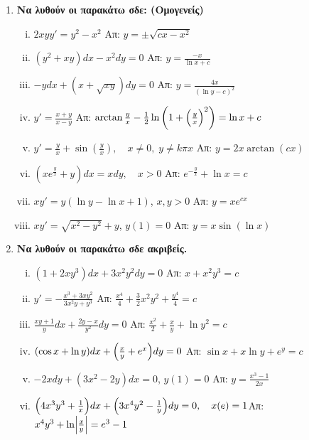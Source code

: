 \documentclass[a4paper,table]{report}
\begin{document}
\begin{enumerate}
  \item {\bfseries Να λυθούν οι παρακάτω σδε: (Ομογενείς)}
    \begin{enumerate}[i)]
      \item $ 2xy y' = y^{2} - x^{2} $ \hfill Απ: $ y = \pm \sqrt{cx-x^{2}} $ 
      \item $ \left(y^{2}+xy\right)dx - x^{2}dy =0 $ 
        \hfill Απ: $ y= \frac{-x}{\ln{x} + c} $ 
      \item $ -ydx+(x+ \sqrt{xy} )dy=0 $ \hfill Απ: $ y= \frac{4x}{(\ln{y} -c)^{2}} $  
      \item $ y'= \frac{x+y}{x-y} $ \hfill Απ: $ \arctan \frac{y}{x} - \frac{1}{2}
        \ln{\left(1 + \Bigl(\frac{y}{x}\Bigr)^{2}\right)} = \ln{x} + c  $  
      \item $y'=\frac{y}{x}+\sin(\frac{y}{x}), \quad x\neq 0,\; y\neq k\pi x$ 
        \hfill Απ: $y=2x\arctan(cx)$
      \item $\left(xe^{\frac{y}{x}}+y\right)dx=xdy, \quad x>0$ 
        \hfill Απ: $e^{-\frac{y}{x}}+\ln x =c$
      \item $ xy'=y(\ln{y} - \ln{x} +1) $, \quad $ x,y>0 $ \hfill Απ: $ y=xe^{cx} $ 
      \item $ xy' = \sqrt{ x^{2}-y^{2} } +y $, \quad $ y(1)=0 $ 
        \hfill Απ: $ y = x \sin{(\ln{x})}$  
    \end{enumerate}

  \item {\bfseries Να λυθούν οι παρακάτω σδε ακριβείς.}
    \begin{enumerate}[i)]
      \item $ (1+2xy^{3})dx + 3x^{2}y^{2}dy = 0 $ 
        \hfill Απ: $x+x^{2}y^{3}=c$ 
      \item $ y'=- \frac{x^{3}+3xy^{2}}{3x^{2}y+y^{3}} $ 
        \hfill Απ: $ \frac{x^{4}}{4} + \frac{3}{2} x^{2}y^{2} + \frac{y^{4}}{4} = c $ 
      \item $ \frac{xy+1}{y} dx + \frac{2y-x}{y^{2}} dy=0 $ 
        \hfill Απ: $ \frac{x^{2}}{2} + \frac{x}{y} + \ln{y^{2}} =c $ 
      \item $ (\cos{x} + \ln{y})dx + \Bigl(\frac{x}{y} + e^{x}\Bigr)dy=0 $ 
        \hfill Απ: $ \sin{x} + x \ln{y} + e^{y}=c $ 
      \item $ -2xdy + (3x^{2}-2y)dx=0 $, \quad $ y(1)=0 $ 
        \hfill Απ: $ y= \frac{x^{3}-1}{2x} $ 
      \item $\Bigl(4x^3y^3+\frac{1}{x}\Bigr)dx+\Bigl(3x^4y^2-\frac{1}{y}\Bigr)dy=0, 
        \quad x(e)=1$\hfill Απ: $x^4y^3+\ln \Bigl|\frac{x}{y}\Bigr|=e^3-1$
    \end{enumerate}


\end{enumerate}
\end{document}
